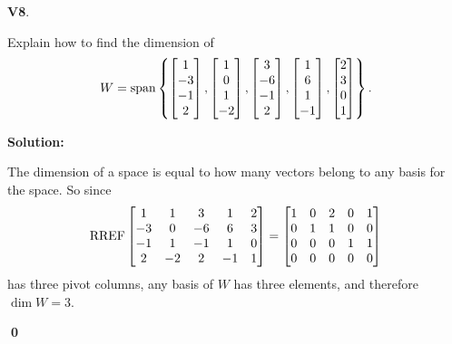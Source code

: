 \documentclass{article}
\newenvironment{problem}[1]
{
  \begin{flushleft}
  \textbf{#1}.
  \ignorespaces
}
{
  \end{flushleft}
}
\newenvironment{solution}
{
  \ignorespaces
  \textbf{Solution:}
}
{
  \ignorespacesafterend
  \begin{flushright}
  {\bfseries \qed}
  \end{flushright}
}
\begin{document}
\begin{problem}{V8}
Explain how to find the dimension of 
\[
  W = \operatorname{span} \left\{
  \begin{bmatrix} 1 \\ -3 \\ -1 \\ 2 \end{bmatrix} ,
  \begin{bmatrix} 1 \\ 0 \\ 1 \\ -2 \end{bmatrix} ,
  \begin{bmatrix} 3 \\ -6 \\ -1 \\ 2 \end{bmatrix} ,
  \begin{bmatrix} 1 \\ 6 \\ 1 \\ -1 \end{bmatrix} ,
  \begin{bmatrix} 2 \\ 3 \\ 0 \\ 1 \end{bmatrix}
  \right\} .
\]
\end{problem}
\begin{solution}
The dimension of a space is equal to how many vectors belong
to any basis for the space.
So since
\[ \operatorname{RREF}
    \begin{bmatrix}
    1 & 1 & 3 & 1 & 2 \\
    -3 & 0 & -6 & 6 & 3 \\
    -1 & 1 & -1 & 1 & 0 \\
    2 & -2 & 2 & -1 & 1
    \end{bmatrix} =
    \begin{bmatrix}
    1 & 0 & 2 & 0 & 1 \\
    0 & 1 & 1 & 0 & 0 \\
    0 & 0 & 0 & 1 & 1 \\
    0 & 0 & 0 & 0 & 0
    \end{bmatrix}
\]
has three pivot columns, any basis of \(W\) has three elements, and therefore \(\dim W = 3\).
\end{solution}
\end{document}
